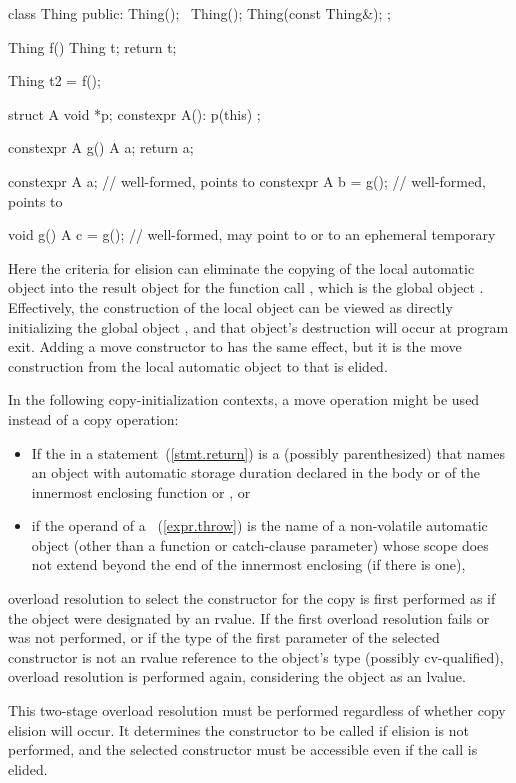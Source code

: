 \pnum
\begin{example}
\begin{codeblock}
class Thing {
public:
  Thing();
  ~Thing();
  Thing(const Thing&);
};

Thing f() {
  Thing t;
  return t;
}

Thing t2 = f();

struct A {
  void *p;
  constexpr A(): p(this) {}
};

constexpr A g() {
  A a;
  return a;
}

constexpr A a;          // well-formed,  points to 
constexpr A b = g();    // well-formed,  points to 

void g() {
  A c = g();            // well-formed,  may point to  or to an ephemeral temporary
}
\end{codeblock}
Here the criteria for elision can
eliminate
the copying of the local automatic object
into the result object for the function call
,
which is the global object
.
Effectively, the construction of the local object
can be viewed as directly initializing the global
object
,
and that object's destruction will occur at program
exit.
Adding a move constructor to  has the same effect, but it is the
move construction from the local automatic object to  that is elided.
\end{example}

\pnum
In the following copy-initialization contexts, a move operation might be used instead of a copy operation:
\begin{itemize}
\item If the  in a  statement~(\ref{stmt.return})
is a (possibly parenthesized) 
that names an object with automatic storage duration declared in the body
or  of the innermost enclosing
function or , or

\item if the operand of a ~(\ref{expr.throw})
is the name of a non-volatile automatic object
(other than a function or catch-clause parameter)
whose scope does not extend beyond the end of the innermost enclosing
 (if there is one),
\end{itemize}
overload resolution to select the constructor
for the copy is first performed as if the object were designated by an
rvalue.
If the first overload resolution fails or was not performed,
or if the type of the first parameter of the selected
constructor is not an rvalue reference to the object's type (possibly cv-qualified),
overload resolution is performed again, considering the object as an lvalue.
\begin{note}
This two-stage overload resolution must be performed regardless
of whether copy elision will occur. It determines the constructor to be called if
elision is not performed, and the selected constructor must be accessible even if
the call is elided.
\end{note}

